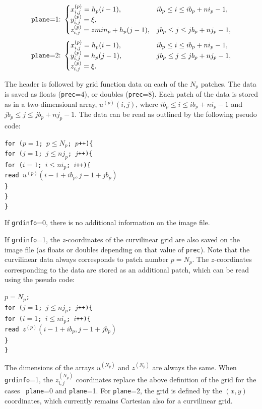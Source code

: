 \documentclass[11pt]{report}
\begin{document}
\[
\mbox{{\tt plane}=1:}\ \begin{cases}
x^{(p)}_{i,j} = h_p(i-1),& ib_p\leq i\leq ib_p+ni_p-1,\\
y^{(p)}_{i,j} = \xi,\\
z^{(p)}_{i,j} = zmin_p + h_p(j-1),& jb_p\leq j\leq jb_p+nj_p-1,
\end{cases}
\]
\[
\mbox{{\tt plane}=2:}\ \begin{cases}
x^{(p)}_{i,j} = h_p(i-1),& \qquad \qquad ib_p\leq i\leq ib_p+ni_p-1, \\
y^{(p)}_{i,j} = h_p(j-1),& \qquad \qquad jb_p\leq j\leq jb_p+nj_p-1, \\
z^{(p)}_{i,j} = \xi.
\end{cases}
\]

The header is followed by grid function data on each of the $N_p$ patches. The data is saved as
floats ({\tt prec}=4), or doubles ({\tt prec}=8). Each patch of the data is stored as in a
two-dimensional array, $u^{(p)}(i,j)$, where $ib_p\leq i \leq ib_p+ni_p-1$ and $jb_p\leq j \leq
jb_p+nj_p-1$. The data can be read as outlined by the following pseudo code:
\begin{flushleft}
{\tt for ($p=1$; $p\leq N_p$; $p$++)\{\\
\hspace{5mm}for ($j=1$; $j\leq nj_p$; $j$++)\{\\
\hspace{10mm}for ($i=1$; $i\leq ni_p$; $i$++)\{\\
\hspace{15mm}read $u^{(p)}(i-1+ib_p, j-1+jb_p)$\\
\hspace{10mm}\}\\
\hspace{5mm}\}\\
\}}
\end{flushleft}
If {\tt grdinfo}=0, there is no additional information on the image file.

If {\tt grdinfo}=1, the $z$-coordinates of the curvilinear grid are also saved on the image file
(as floats or doubles depending on that value of {\tt prec}). Note that the curvilinear data always
corresponds to patch number $p=N_p$. The $z$-coordinates corresponding to the data are stored as an
additional patch, which can be read using the pseudo code:
\begin{flushleft}
{\tt $p=N_p$;\\
for ($j=1$; $j\leq nj_p$; $j$++)\{\\
\hspace{5mm}for ($i=1$; $i\leq ni_p$; $i$++)\{\\
\hspace{10mm}read $z^{(p)}(i-1+ib_p, j-1+jb_p)$\\
\hspace{5mm}\}\\
\}}
\end{flushleft}
The dimensions of the arrays $u^{(N_p)}$ and $z^{(N_p)}$ are always the same.  When {\tt grdinfo}=1,
the $z^{(N_p)}_{i,j}$ coordinates replace the above definition of the grid for the cases {\tt
  plane}=0 and {\tt plane}=1. For {\tt plane}=2, the grid is defined by the $(x,y)$ coordinates,
which currently remains Cartesian also for a curvilinear grid.
\end{document}
